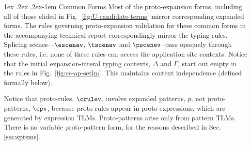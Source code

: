 \documentclass[acmsmall]{acmart}
\makeatletter
\renewcommand{\paragraph}{%
  \@startsection{paragraph}{4}%
  {\z@}{1ex \@plus .2ex \@minus .2ex}{-1em}%
  {\normalfont\normalsize\bfseries}%
}
\makeatother
\begin{document}
\paragraph{Common Forms} Most of the proto-expansion forms, including all of those elided in Fig.~\ref{fig:U-candidate-terms} mirror corresponding expanded forms. The rules governing proto-expansion validation for these common forms  in the accompanying technical report correspondingly mirror the typing rules. Splicing scenes---$\escenev$, $\tscenev$ and $\pscenev$--pass opaquely through these rules, i.e. none of these rules can access the application site contexts. Notice that the initial expansion-interal typing contexts, $\Delta$ and $\Gamma$, start out empty in the rules in Fig.~\ref{fig:ee-ap-setlm}. This maintains context independence (defined formally below).

Notice that proto-rules, $\crulev$, involve expanded patterns, $p$, not proto-patterns, $\cpv$, because proto-rules appear in proto-expressions, which are generated by expression TLMs. Proto-patterns arise only from pattern TLMs. There is no variable proto-pattern form, for the reasons described in Sec. \ref{sec:sptsms}.
\end{document}
